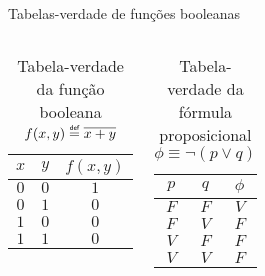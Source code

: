 \expandafter\documentclass\expandafter[table, usenames, svgnames, dvipsnames,14pt, \classopts]{beamer}
\newcommand\defeq{\mathrel{\overset{\makebox[0pt]{\mbox{\normalfont\tiny\sffamily def}}}{=}}}
\begin{document}
\begin{frame}{Tabelas-verdade de funções booleanas}

    \begin{columns}[c]
            \begin{center}
                \begin{table}
                    \caption{Tabela-verdade da função booleana $f(x,y) \defeq \overline{x + y}$}
                    \vspace{1em}
                    \begin{tabular}{cc|c}
                        $x$ & $y$ & $f(x,y)$\\
                        \hline
                        $0$ & $0$ & $1$\\
                        $0$ & $1$ & $0$\\
                        $1$ & $0$ & $0$\\
                        $1$ & $1$ & $0$\\
                    \end{tabular}
                \end{table}
            \end{center}

            \begin{center}
                \begin{table}
                    \caption{Tabela-verdade da fórmula proposicional $\phi \equiv \lnot(p \lor q)$}
                    \vspace{1em}
                    \begin{tabular}{cc|c}
                        $p$ & $q$ & $\phi$\\
                        \hline
                        $F$ & $F$ & $V$\\
                        $F$ & $V$ & $F$\\
                        $V$ & $F$ & $F$\\
                        $V$ & $V$ & $F$\\
                    \end{tabular}
                \end{table}
            \end{center}
    \end{columns}
            
\end{frame}
\end{document}
